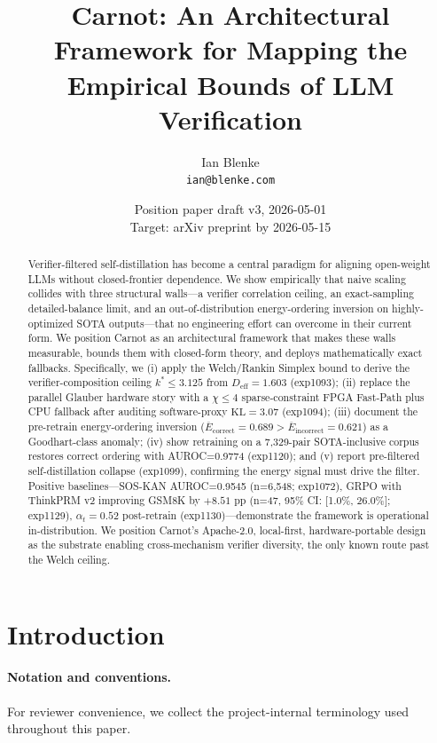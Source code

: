\documentclass[10pt]{article}
\title{Carnot: An Architectural Framework for Mapping the\\Empirical Bounds of LLM Verification}
\author{Ian Blenke \\ \texttt{ian@blenke.com}}
\date{Position paper draft v3, 2026-05-01\\
Target: arXiv preprint by 2026-05-15}
\begin{document}
\maketitle

\begin{abstract}
Verifier-filtered self-distillation has become a central paradigm
for aligning open-weight LLMs without closed-frontier dependence.
We show empirically that naive scaling collides with three structural
walls---a verifier correlation ceiling, an exact-sampling
detailed-balance limit, and an out-of-distribution energy-ordering
inversion on highly-optimized SOTA outputs---that no engineering
effort can overcome in their current form. We position Carnot as an
architectural framework that makes these walls measurable, bounds
them with closed-form theory, and deploys mathematically exact
fallbacks. Specifically, we (i) apply the Welch/Rankin Simplex
bound to derive the verifier-composition ceiling $k^* \leq 3.125$
from $D_{\mathrm{eff}} = 1.603$ (exp1093); (ii) replace the
parallel Glauber hardware story with a $\chi \leq 4$
sparse-constraint FPGA Fast-Path plus CPU fallback after auditing
software-proxy $\mathrm{KL} = 3.07$ (exp1094); (iii) document
the pre-retrain energy-ordering inversion
($\overline{E}_{\mathrm{correct}} = 0.689 > \overline{E}_{\mathrm{incorrect}} = 0.621$)
as a Goodhart-class anomaly; (iv) show retraining on a 7{,}329-pair
SOTA-inclusive corpus restores correct ordering with AUROC=0.9774
(exp1120); and (v) report pre-filtered self-distillation collapse
(exp1099), confirming the energy signal must drive the filter.
Positive baselines---SOS-KAN AUROC=0.9545 (n=6{,}548; exp1072),
GRPO with ThinkPRM v2 improving GSM8K by $+8.51$ pp
(n=47, 95\% CI: [1.0\%, 26.0\%]; exp1129),
$\alpha_t = 0.52$ post-retrain (exp1130)---demonstrate
the framework is operational in-distribution. We position Carnot's
Apache-2.0, local-first, hardware-portable design as the substrate
enabling cross-mechanism verifier diversity, the only known route
past the Welch ceiling.
\end{abstract}

\section{Introduction}

\paragraph{Notation and conventions.} For reviewer convenience, we
collect the project-internal terminology used throughout this paper.
\end{document}
